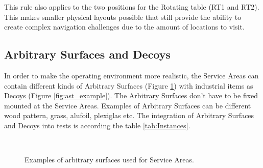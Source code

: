 This rule also applies to the two positions for the Rotating table (RT1 and RT2).
This makes smaller physical layouts possible that still provide the ability to create complex navigation challenges due to the amount of locations to visit.


\subsection{Arbitrary Surfaces and Decoys}
\label{subsec:Arbitrary_Surfaces_and_Decoys}

In order to make the operating environment more realistic, the Service Areas can contain different kinds of Arbitrary Surfaces (Figure \ref{fig:ast_surface_example}) with industrial items as Decoys (Figure \ref{fig:ast_example}). The Arbitrary Surfaces don't have to be fixed mounted at the Service Areas. Examples of Arbitrary Surfaces can be different wood pattern, grass, alufoil, plexiglas etc. The integration of Arbitrary Surfaces and Decoys into tests is according the table \ref{tab:Instances}.

\begin{figure}[h!]
	\centering
	\hspace{.05\textwidth}
	\hspace{.05\textwidth}
	\\
	\hspace{.05\textwidth}
	\caption{Examples of arbitrary surfaces used for Service Areas.}
	\label{fig:ast_surface_example}
\end{figure}

